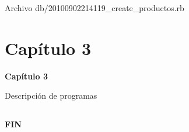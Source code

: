 \documentclass{beamer}
\begin{document}
\begin{frame}
Archivo db/20100902214119\_create\_productos.rb

\end{frame}

\section{Capítulo 3}

\begin{frame}
\textbf{Capítulo 3}

\mbox{}

Descripción de programas
\end{frame}

\subsection{}
\begin{frame}
\begin{center}
\huge{\textbf{FIN}}
\end{center}
\end{frame}
\end{document}
